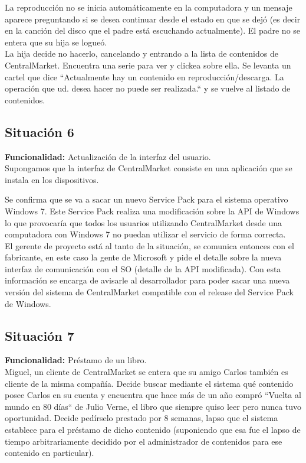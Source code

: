 \documentclass[11pt, a4paper, spanish]{article}
\begin{document}
      La reproducci\'on no se inicia autom\'aticamente en la computadora y un mensaje aparece preguntando si se desea continuar desde el estado en que se   
   dej\'o (es decir en la canci\'on del disco que el padre est\'a escuchando actualmente). El padre no se entera que su hija se logue\'o.\\

      La hija decide no hacerlo, cancelando y entrando a la lista de contenidos de CentralMarket. Encuentra una serie para ver y clickea sobre ella. Se 
   levanta un cartel que dice ``Actualmente hay un contenido en reproducci\'on/descarga. La operaci\'on que ud. desea hacer no puede ser realizada.`` 	  y se vuelve al listado de contenidos.

\subsection{Situaci\'on 6}

	\textbf{Funcionalidad:} Actualizaci\'on de la interfaz del usuario.\\

	Supongamos que la interfaz de CentralMarket consiste en una aplicaci\'on que se instala en los dispositivos.

	Se confirma que se va a sacar un nuevo Service Pack para el sistema operativo Windows 7. Este Service Pack realiza una modificaci\'on sobre la   
   API de Windows lo que provocar\'ia que todos los usuarios utilizando CentralMarket desde una computadora con Windows 7 no puedan utilizar el servicio 
   de forma correcta.\\

       El gerente de proyecto est\'a al tanto de la situaci\'on, se comunica entonces con el fabricante, en este caso la gente de Microsoft y pide el    
   detalle sobre la nueva interfaz de comunicaci\'on con el SO (detalle de la API modificada). Con esta informaci\'on se encarga de avisarle al 
   desarrollador para poder sacar una nueva versi\'on del sistema de CentralMarket compatible con el release del Service Pack de Windows.

\subsection{Situaci\'on 7}

	\textbf{Funcionalidad:} Pr\'estamo de un libro.\\

	Miguel, un cliente de CentralMarket se entera que su amigo Carlos tambi\'en es cliente de la misma compa\~{n}\'ia. Decide buscar mediante el sistema    
   qu\'e contenido posee Carlos en su cuenta y encuentra que hace m\'as de un a\~{n}o compr\'o ``Vuelta al mundo en 80 d\'ias`` de Julio Verne, el libro que siempre quiso leer pero nunca tuvo oportunidad. Decide ped\'irselo prestado por 8 semanas, lapso que el sistema establece para el pr\'estamo de dicho contenido (suponiendo que esa fue el lapso de tiempo arbitrariamente decidido por el administrador de contenidos para ese contenido en particular). \\
\end{document}
